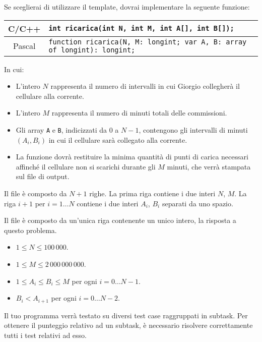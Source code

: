Se sceglierai di utilizzare il template, dovrai implementare la seguente funzione:
\begin{center}\begin{tabularx}{\textwidth}{|c|X|}
\hline
C/C++  & \verb|int ricarica(int N, int M, int A[], int B[]);|\\
\hline
Pascal & \verb|function ricarica(N, M: longint; var A, B: array of longint): longint;|\\
\hline
\end{tabularx}\end{center}
In cui:
\begin{itemize}[nolistsep]
  \item L'intero $N$ rappresenta il numero di intervalli in cui Giorgio collegherà il cellulare alla corrente.
  \item L'intero $M$ rappresenta il numero di minuti totali delle commissioni.
  \item Gli array \texttt{A} e \texttt{B}, indicizzati da $0$ a $N-1$, contengono gli intervalli di minuti $(A_i, B_i)$ in cui il cellulare sarà collegato alla corrente.
  \item La funzione dovrà restituire la minima quantità di punti di carica necessari affinché il cellulare non si scarichi durante gli $M$ minuti, che verrà stampata sul file di output.
\end{itemize}

\InputFile
Il file  è composto da $N+1$ righe. La prima riga contiene i due interi $N$, $M$. La riga $i+1$ per $i=1 \ldots N$ contiene i due interi $A_i$, $B_i$ separati da uno spazio.

\OutputFile
Il file \outputfile{} è composto da un'unica riga contenente un unico intero, la risposta a questo problema.

\pagebreak
\Constraints
\begin{itemize}[nolistsep, itemsep=2mm]
	\item $1 \le N \le 100\,000$.
	\item $1 \le M \le 2\,000\,000\,000$.
	\item $1 \le A_i \le B_i \le M$ per ogni $i=0\ldots N-1$.
	\item $B_i < A_{i+1}$ per ogni $i=0\ldots N-2$.
\end{itemize}

\Scoring
Il tuo programma verrà testato su diversi test case raggruppati in subtask.
Per ottenere il punteggio relativo ad un subtask, è necessario risolvere
correttamente tutti i test relativi ad esso.

